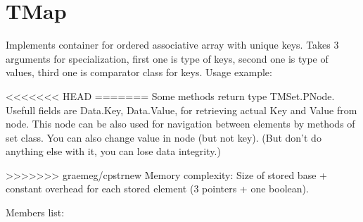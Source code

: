 \chapter{TMap}

Implements container for ordered associative array with unique keys.
Takes 3 arguments for specialization, first one is type of keys, second one is type of values, third
one is comparator class for keys.
Usage example:



<<<<<<< HEAD
=======
Some methods return type TMSet.PNode. Usefull fields are Data.Key, Data.Value, for retrieving
actual Key and Value from node. This node can be also used for navigation between elements by methods of set class.
You can also change value in node (but not key).
(But don't do anything else with it, you can lose data integrity.)

>>>>>>> graemeg/cpstrnew
Memory complexity:
Size of stored base + constant overhead for each stored element (3 pointers + one boolean).

Members list:

